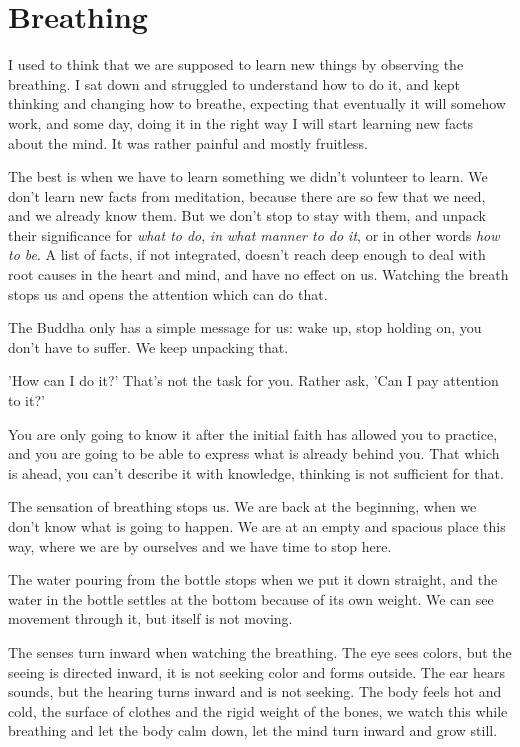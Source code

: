 \hypertarget{breathing-1}{%
\chapter{Breathing}\label{breathing-1}}

I used to think that we are supposed to learn new things by observing
the breathing. I sat down and struggled to understand how to do it, and
kept thinking and changing how to breathe, expecting that eventually it
will somehow work, and some day, doing it in the right way I will start
learning new facts about the mind. It was rather painful and mostly
fruitless.

The best is when we have to learn something we didn't volunteer to
learn. We don't learn new facts from meditation, because there are so
few that we need, and we already know them. But we don't stop to stay
with them, and unpack their significance for \emph{what to do}, \emph{in
what manner to do it}, or in other words \emph{how to be}. A list of
facts, if not integrated, doesn't reach deep enough to deal with root
causes in the heart and mind, and have no effect on us. Watching the
breath stops us and opens the attention which can do that.

The Buddha only has a simple message for us: wake up, stop holding on,
you don't have to suffer. We keep unpacking that.

'How can I do it?' That's not the task for you. Rather ask, 'Can I pay
attention to it?'

You are only going to know it after the initial faith has allowed you to
practice, and you are going to be able to express what is already behind
you. That which is ahead, you can't describe it with knowledge, thinking
is not sufficient for that.

The sensation of breathing stops us. We are back at the beginning, when
we don't know what is going to happen. We are at an empty and spacious
place this way, where we are by ourselves and we have time to stop here.

The water pouring from the bottle stops when we put it down straight,
and the water in the bottle settles at the bottom because of its own
weight. We can see movement through it, but itself is not moving.

The senses turn inward when watching the breathing. The eye sees colors,
but the seeing is directed inward, it is not seeking color and forms
outside. The ear hears sounds, but the hearing turns inward and is not
seeking. The body feels hot and cold, the surface of clothes and the
rigid weight of the bones, we watch this while breathing and let the
body calm down, let the mind turn inward and grow still.

